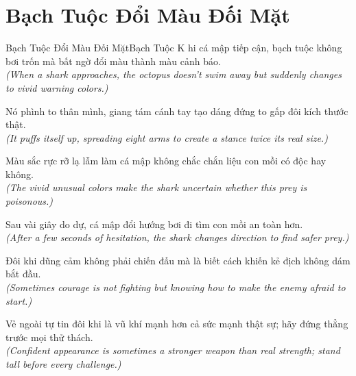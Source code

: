 \section{Bạch Tuộc Đổi Màu Đối Mặt}
\begin{truyen}{Bạch Tuộc Đổi Màu Đối Mặt}{Bạch Tuộc}
K hi cá mập tiếp cận, bạch tuộc không bơi trốn mà bất ngờ đổi màu thành màu cảnh báo.\\
\textit{(When a shark approaches, the octopus doesn't swim away but suddenly changes to vivid warning colors.)}

Nó phình to thân mình, giang tám cánh tay tạo dáng đứng to gấp đôi kích thước thật.\\
\textit{(It puffs itself up, spreading eight arms to create a stance twice its real size.)}

Màu sắc rực rỡ lạ lẫm làm cá mập không chắc chắn liệu con mồi có độc hay không.\\
\textit{(The vivid unusual colors make the shark uncertain whether this prey is poisonous.)}

Sau vài giây do dự, cá mập đổi hướng bơi đi tìm con mồi an toàn hơn.\\
\textit{(After a few seconds of hesitation, the shark changes direction to find safer prey.)}

Đôi khi dũng cảm không phải chiến đấu mà là biết cách khiến kẻ địch không dám bắt đầu.\\
\textit{(Sometimes courage is not fighting but knowing how to make the enemy afraid to start.)}

\end{truyen}
\begin{baihoc}
  Vẻ ngoài tự tin đôi khi là vũ khí mạnh hơn cả sức mạnh thật sự; hãy đứng thẳng trước mọi thử thách.\\
  \textit{(Confident appearance is sometimes a stronger weapon than real strength; stand tall before every challenge.)}
\end{baihoc}

